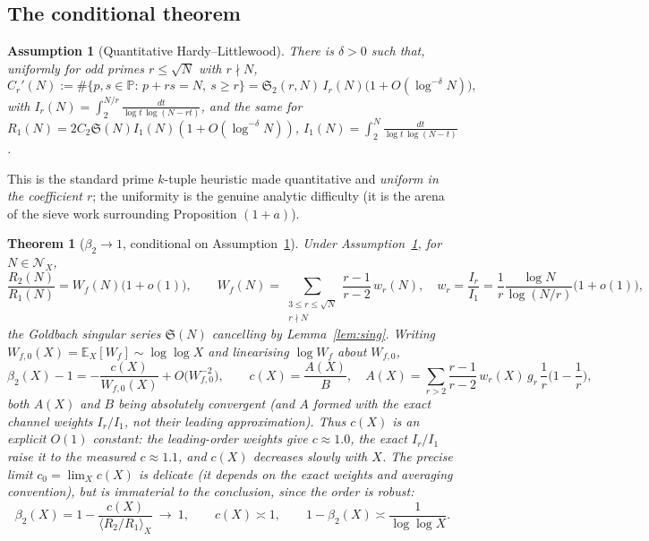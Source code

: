 \documentclass[]{interact}%
\newtheorem{theorem}{Theorem}
\newtheorem{assumption}{Assumption}
\newcommand{\PP}{\mathbb P}
\newcommand{\sing}{\mathfrak S}
\begin{document}
\subsection{The conditional theorem}

\begin{assumption}[Quantitative Hardy--Littlewood]\label{ass:HL}
There is $\delta>0$ such that, uniformly for odd primes $r\le\sqrt N$ with $r\nmid N$,
\[
  C_r'(N):=\#\{p,s\in\PP:\,p+rs=N,\ s\ge r\}
  =\sing_2(r,N)\,I_r(N)\big(1+O(\log^{-\delta}N)\big),
\]
with $I_r(N)=\int_{2}^{N/r}\frac{dt}{\log t\,\log(N-rt)}$, and the same for
$R_1(N)=2C_2\sing(N)I_1(N)(1+O(\log^{-\delta}N))$, $I_1(N)=\int_2^{N}\frac{dt}{\log t\,\log(N-t)}$.
\end{assumption}

This is the standard prime $k$-tuple heuristic made quantitative and \emph{uniform in
the coefficient $r$}; the uniformity is the genuine analytic difficulty (it is the
arena of the sieve work surrounding Proposition $(1+a)$).

\begin{theorem}[$\beta_2\to1$, conditional on Assumption~\ref{ass:HL}]\label{thm:beta}
Under Assumption~\ref{ass:HL}, for $N\in\mathcal N_X$,
\[
  \frac{R_2(N)}{R_1(N)}=W_f(N)\big(1+o(1)\big),\qquad
  W_f(N)=\sum_{\substack{3\le r\le\sqrt N\\ r\nmid N}}\frac{r-1}{r-2}\,w_r(N),
  \quad w_r=\frac{I_r}{I_1}=\frac1r\frac{\log N}{\log(N/r)}\big(1+o(1)\big),
\]
the Goldbach singular series $\sing(N)$ cancelling by Lemma~\ref{lem:sing}.
Writing $W_{f,0}(X)=\mathbb E_X[W_f]\sim\log\log X$ and linearising
$\log W_f$ about $W_{f,0}$,
\[
  \beta_2(X)-1=-\frac{c(X)}{W_{f,0}(X)}+O\!\big(W_{f,0}^{-2}\big),
  \qquad
  c(X)=\frac{A(X)}{B},\quad
  A(X)=\sum_{r>2}\frac{r-1}{r-2}\,w_r(X)\,g_r\,\frac1r\Big(1-\frac1r\Big),
\]
both $A(X)$ and $B$ being absolutely convergent (and $A$ formed with the \emph{exact}
channel weights $I_r/I_1$, not their leading approximation). Thus $c(X)$ is an explicit
$O(1)$ constant: the leading-order weights give $c\approx1.0$, the exact $I_r/I_1$ raise
it to the measured $c\approx1.1$, and $c(X)$ decreases slowly with $X$. The precise limit
$c_0=\lim_X c(X)$ is delicate (it depends on the exact weights and averaging convention),
but is immaterial to the conclusion, since the \emph{order} is robust:
\[
  \boxed{\ \beta_2(X)=1-\frac{c(X)}{\langle R_2/R_1\rangle_X}\ \longrightarrow\ 1,\qquad
  c(X)\asymp1,\qquad 1-\beta_2(X)\asymp\frac{1}{\log\log X}.\ }
\]
\end{theorem}
\end{document}
